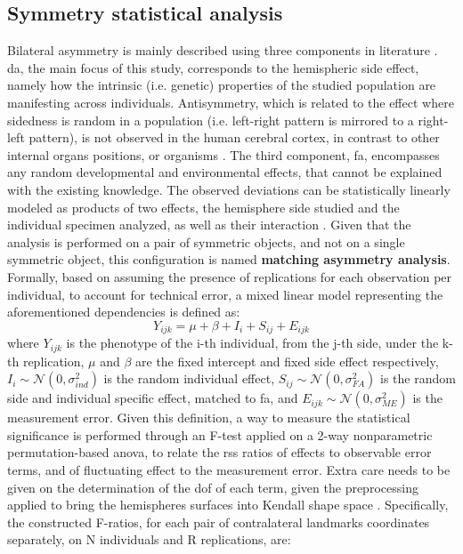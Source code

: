 \subsection{Symmetry statistical analysis}
\label{subsec:stat_methods}
Bilateral asymmetry is mainly described using three components in literature \cite{klingenberg2002}\cite{Vingerhoets2021}. \Acf{da}, the main focus of this study, corresponds to the hemispheric side effect, namely how the intrinsic (i.e. genetic) properties of the studied population are manifesting across individuals. Antisymmetry, which is related to the effect where sidedness is random in a population (i.e. left-right pattern is mirrored to a right-left pattern), is not observed in the human cerebral cortex, in contrast to other internal organs positions, or organisms \cite{Neubauer2020}. The third component, \acf{fa}, encompasses any random developmental and environmental effects, that cannot be explained with the existing knowledge. The observed deviations can be statistically linearly modeled as products of two effects, the hemisphere side studied and the individual specimen analyzed, as well as their interaction \cite{klingenberg2002}. Given that the analysis is performed on a pair of symmetric objects, and not on a single symmetric object, this configuration is named \textbf{matching asymmetry analysis}. Formally, based on \cite{VanDongen1999} assuming the presence of replications for each observation per individual, to account for technical error, a mixed linear model representing the aforementioned dependencies is defined as:
\begin{equation}
Y_{ijk} = \mu + \beta + I_i + S_{ij} + E_{ijk}
\end{equation}
where $Y_{ijk}$ is the phenotype of the i-th individual, from the j-th side, under the k-th replication, $\mu$ and $\beta$ are the fixed intercept and fixed side effect respectively, $I_i\sim\mathcal{N}(0,\sigma^2_{ind})$ is the random individual effect,  $S_{ij}\sim\mathcal{N}(0,\sigma^2_{FA})$ is the random side and individual specific effect, matched to \ac{fa}, and $E_{ijk}\sim\mathcal{N}(0,\sigma^2_{ME})$ is the measurement error. Given this definition, a way to measure the statistical significance is performed through an F-test applied on a 2-way nonparametric permutation-based \ac{anova}, to relate the \ac{rss} ratios of effects to observable error terms, and of fluctuating effect to the measurement error. Extra care needs to be given on the determination of the \ac{dof} of each term, given the preprocessing applied to bring the hemispheres surfaces into Kendall shape space \cite{klingenberg2002}.  Specifically, the constructed F-ratios, for each pair of contralateral landmarks coordinates separately, on N individuals and R replications, are:
